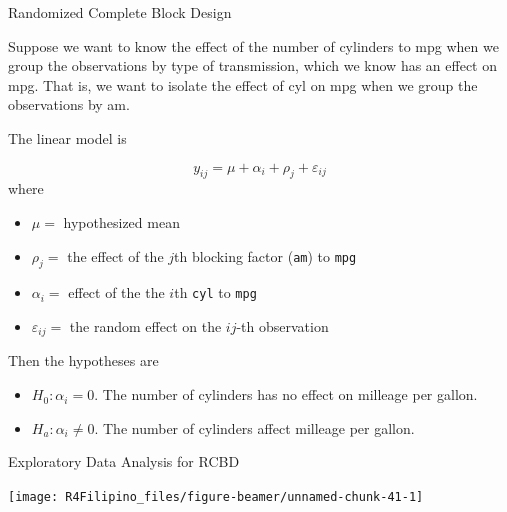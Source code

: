 \begin{frame}[fragile]{Randomized Complete Block Design}

Suppose we want to know the effect of the number of cylinders to mpg
when we group the observations by type of transmission, which we know
has an effect on mpg. That is, we want to isolate the effect of cyl on
mpg when we group the observations by am.

The linear model is

\[
y_{ij} = \mu + \alpha_i + \rho_j + \varepsilon_{ij}
\] where

\begin{itemize}
\tightlist
\item
  \(\mu=\) hypothesized mean
\item
  \(\rho_j=\) the effect of the \(j\)th blocking factor (\texttt{am}) to
  \texttt{mpg}
\item
  \(\alpha_i=\) effect of the the \(i\)th \texttt{cyl} to \texttt{mpg}
\item
  \(\varepsilon_{ij}=\) the random effect on the \(ij\)-th observation
\end{itemize}

Then the hypotheses are

\begin{itemize}
\tightlist
\item
  \(H_0:\alpha_i = 0\). The number of cylinders has no effect on
  milleage per gallon.
\item
  \(H_a:\alpha_i \neq 0\). The number of cylinders affect milleage per
  gallon.
\end{itemize}

\end{frame}

\begin{frame}[fragile]{Exploratory Data Analysis for RCBD}

\begin{Shaded}
\end{Shaded}

\begin{center}\texttt{[image: R4Filipino\_files/figure-beamer/unnamed-chunk-41-1]} \end{center}

\end{frame}

